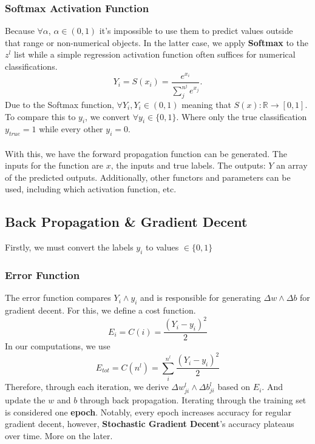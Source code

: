 \documentclass[11pt,letterpaper]{amsbook}
\theoremstyle{definition}
\numberwithin{definition}{chapter}
\numberwithin{exercise}{chapter}
\numberwithin{section}{chapter}
\newcommand{\ds}{\displaystyle}
\begin{document}
\subsubsection{Softmax Activation Function}
Because $\forall \alpha$, $\alpha \in (0, 1)$ it's impossible to use them to predict values outside that range or non-numerical objects. In the latter case, we apply \textbf{Softmax} to the $\ds z^l$ list while a simple regression activation function often suffices for numerical classifications.
\begin{equation}
    Y_i = S(x_i) = \frac{e^{x_i}}{\sum^{n^j}_{j} e^{x_j}}.
\end{equation}
Due to the Softmax function, $\forall Y_i, Y_i \in (0, 1)$ meaning that $S(x): \mathbb{R} \to [0, 1]$. To compare this to $y_i$, we convert $\forall y_i \in \{0, 1\}$. Where only the true classification $y_{true} = 1$ while every other $y_i = 0$. \\ \\
With this, we have the forward propagation function can be generated. The inputs for the function are $x$, the inputs and true labels. The outputs: $Y$ an array of the predicted outputs. Additionally, other functors and parameters can be used, including which activation function, etc.
\newpage


\subsection{Back Propagation \& Gradient Decent} 
\vspace{1em}
Firstly, we must convert the labels $y_i$ to values $\in \{0, 1\}$ \\

\subsubsection{Error Function}
The error function compares $Y_i \land y_i$ and is responsible for generating $\Delta w \land \Delta b$ for gradient decent. For this, we define a cost function.
\begin{equation}
    E_i = C(i) = \frac{(Y_i - y_i)^2}{2}
\end{equation}
In our computations, we use
\begin{equation}
    E_{tot} = C(n^l) = \sum^{n^l}_i \frac{(Y_i - y_i)^2}{2}
\end{equation}
Therefore, through each iteration, we derive $\Delta w^{l}_{ji}\land \Delta b^{l}_{ji}$ based on $\ds E_{i}$. And update the $w$ and $b$ through back propagation. Iterating through the training set is considered one \textbf{epoch}. Notably, every epoch increases accuracy for regular gradient decent, however, \textbf{Stochastic Gradient Decent}'s accuracy plateaus over time. More on the later.
\vspace{2em}
\end{document}
